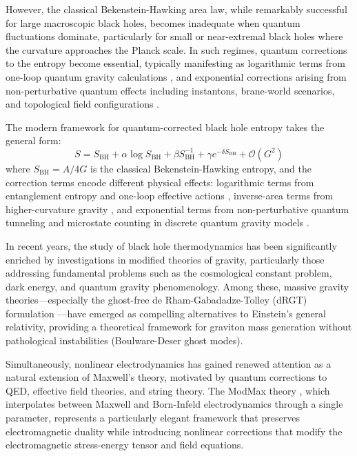 \documentclass[12pt]{article}
\begin{document}
However, the classical Bekenstein-Hawking area law, while remarkably successful for large macroscopic black holes, becomes inadequate when quantum fluctuations dominate, particularly for small or near-extremal black holes where the curvature approaches the Planck scale. In such regimes, quantum corrections to the entropy become essential, typically manifesting as logarithmic terms from one-loop quantum gravity calculations \cite{Solodukhin2011,Sen2012}, and exponential corrections arising from non-perturbative quantum effects including instantons, brane-world scenarios, and topological field configurations \cite{Banerjee2010,Majhi2012}.

The modern framework for quantum-corrected black hole entropy takes the general form:
\begin{equation}
S = S_{\text{BH}} + \alpha \log S_{\text{BH}} + \beta S_{\text{BH}}^{-1} + \gamma e^{-\delta S_{\text{BH}}} + \mathcal{O}(G^2)
\end{equation}
where $S_{\text{BH}} = A/4G$ is the classical Bekenstein-Hawking entropy, and the correction terms encode different physical effects: logarithmic terms from entanglement entropy and one-loop effective actions \cite{Fursaev1995,Mann1997}, inverse-area terms from higher-curvature gravity \cite{Jacobson2003}, and exponential terms from non-perturbative quantum tunneling and microstate counting in discrete quantum gravity models \cite{Carlip2000,Kaul2000}.

In recent years, the study of black hole thermodynamics has been significantly enriched by investigations in modified theories of gravity, particularly those addressing fundamental problems such as the cosmological constant problem, dark energy, and quantum gravity phenomenology. Among these, massive gravity theories—especially the ghost-free de Rham-Gabadadze-Tolley (dRGT) formulation \cite{deRham2011,Hassan2012}—have emerged as compelling alternatives to Einstein's general relativity, providing a theoretical framework for graviton mass generation without pathological instabilities (Boulware-Deser ghost modes).

Simultaneously, nonlinear electrodynamics has gained renewed attention as a natural extension of Maxwell's theory, motivated by quantum corrections to QED, effective field theories, and string theory. The ModMax theory \cite{Bandos2020,Bandos2021}, which interpolates between Maxwell and Born-Infeld electrodynamics through a single parameter, represents a particularly elegant framework that preserves electromagnetic duality while introducing nonlinear corrections that modify the electromagnetic stress-energy tensor and field equations.
\end{document}
